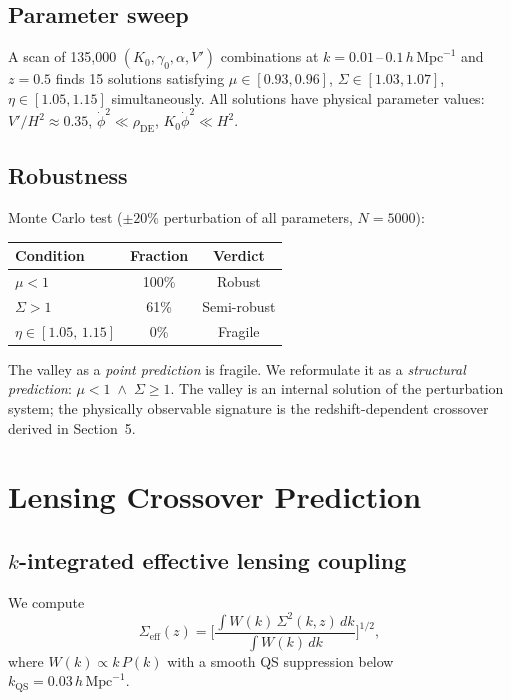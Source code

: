 \documentclass[11pt,a4paper]{article}
\begin{document}
\subsection{Parameter sweep}

A scan of 135,000 $(K_0, \gamma_0, \alpha, V')$ combinations at
$k = 0.01$\,--\,$0.1$\,$h\,\mathrm{Mpc}^{-1}$ and $z = 0.5$ finds
15 solutions satisfying $\mu \in [0.93,0.96]$, $\Sigma \in [1.03,1.07]$,
$\eta \in [1.05,1.15]$ simultaneously.  All solutions have physical
parameter values: $V'/H^2 \approx 0.35$, $\dot\phi^2 \ll \rho_{\mathrm{DE}}$,
$K_0\dot\phi^2 \ll H^2$.

\subsection{Robustness}

Monte Carlo test ($\pm 20\%$ perturbation of all parameters, $N = 5000$):
\begin{center}
\begin{tabular}{@{}lcc@{}}
\toprule
Condition & Fraction & Verdict \\
\midrule
$\mu < 1$ & 100\% & Robust \\
$\Sigma > 1$ & 61\% & Semi-robust \\
$\eta \in [1.05,\,1.15]$ & 0\% & Fragile \\
\bottomrule
\end{tabular}
\end{center}

The valley as a \emph{point prediction} is fragile.  We reformulate
it as a \emph{structural prediction}: $\mu < 1 \;\wedge\; \Sigma \geq 1$.
The valley is an internal solution of the perturbation system; the
physically observable signature is the redshift-dependent crossover
derived in Section~5.

\newpage
\section{Lensing Crossover Prediction}

\subsection{$k$-integrated effective lensing coupling}

We compute
\begin{equation}
\Sigma_{\mathrm{eff}}(z)
  = \biggl[\frac{\int W(k)\,\Sigma^2(k,z)\,dk}{\int W(k)\,dk}\biggr]^{1/2},
\end{equation}
where $W(k) \propto k\,P(k)$ with a smooth QS suppression below
$k_{\mathrm{QS}} = 0.03\,h\,\mathrm{Mpc}^{-1}$.
\end{document}
